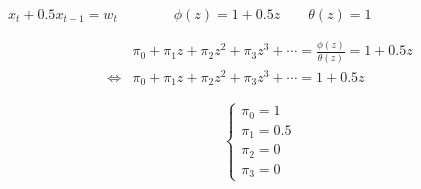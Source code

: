 $x_t + 0.5x_{t-1} = w_t \qquad\qquad \phi(z) = 1+0.5z \qquad \theta(z) = 1$


\begin{align*}
    & \pi_0 + \pi_1 z + \pi_2 z^2 + \pi_3 z^3 + \cdots =\frac{\phi(z)}{\theta(z)} = 1+0.5z\\
\iff & \pi_0 + \pi_1 z + \pi_2 z^2 + \pi_3 z^3 + \cdots = 1+0.5z
\end{align*}

$$\begin{cases}
    \pi_0 = 1\\
    \pi_1 = 0.5\\
    \pi_2 = 0\\
    \pi_3 =0
\end{cases}$$